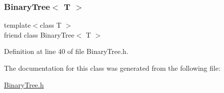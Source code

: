 \subsubsection{\texorpdfstring{Binary\+Tree$<$ T $>$}{BinaryTree< T >}}
{\footnotesize\ttfamily template$<$class T $>$ \\
friend class Binary\+Tree$<$ T $>$\hspace{0.3cm}{\ttfamily [friend]}}



Definition at line 40 of file Binary\+Tree.\+h.



The documentation for this class was generated from the following file\+:\begin{DoxyCompactItemize}
\item 
\mbox{\hyperlink{_binary_tree_8h}{Binary\+Tree.\+h}}\end{DoxyCompactItemize}
